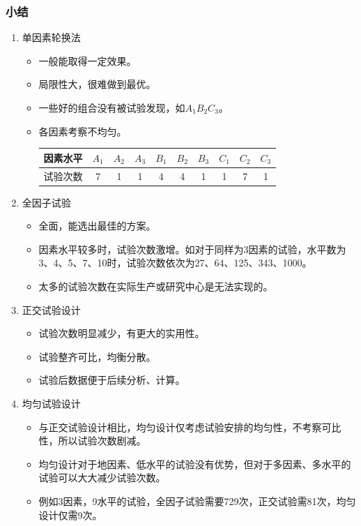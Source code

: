 \documentclass[UTF8]{ctexart}
\begin{document}
\subsubsection{小结}
\begin{enumerate}[•]
\item 单因素轮换法
\begin{itemize}
\item 一般能取得一定效果。
\item 局限性大，很难做到最优。
\item 一些好的组合没有被试验发现，如$A_1$$B_2$$C_3$。
\item 各因素考察不均匀。
\begin{center}
\begin{tabular}{cccccccccc}
\toprule
因素水平&$A_1$&$A_2$&$A_3$&$B_1$&$B_2$&$B_3$&$C_1$&$C_2$&$C_3$\\ 
\midrule
试验次数& 7&1  &1  &4  &4  &1  &1  &7  &1  \\
\bottomrule
\end{tabular}
\end{center}

\end{itemize}
\item 全因子试验
\begin{itemize}
\item 全面，能选出最佳的方案。
\item 因素水平较多时，试验次数激增。如对于同样为3因素的试验，水平数为3、4、5、7、10时，试验次数依次为27、64、125、343、1000。
\item 太多的试验次数在实际生产或研究中心是无法实现的。
\end{itemize}
\item 正交试验设计
\begin{itemize}
\item 试验次数明显减少，有更大的实用性。
\item 试验整齐可比，均衡分散。
\item 试验后数据便于后续分析、计算。
\end{itemize}
\item 均匀试验设计
\begin{itemize}
\item 与正交试验设计相比，均匀设计仅考虑试验安排的均匀性，不考察可比性，所以试验次数剧减。
\item 均匀设计对于地因素、低水平的试验没有优势，但对于多因素、多水平的试验可以大大减少试验次数。
\item 例如3因素，9水平的试验，全因子试验需要729次，正交试验需81次，均匀设计仅需9次。
\end{itemize}
\end{enumerate}
\end{document}
